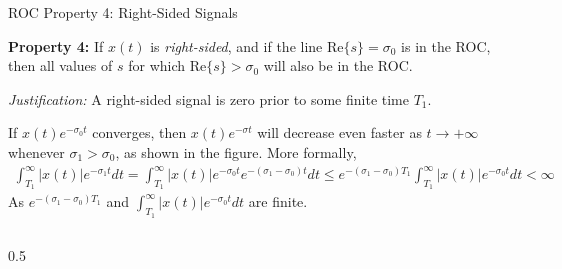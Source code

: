 \begin{frame}[fragile]{ROC Property 4: Right-Sided Signals}
    \begin{tcolorbox}[colframe=PrimaryColor, colback=PrimaryColor!10]
        \textbf{Property 4:} If $x(t)$ is \textit{right-sided}, and if the line $\text{Re}\{s\} = \sigma_0$ is in the ROC, then all values of $s$ for which $\text{Re}\{s\} > \sigma_0$ will also be in the ROC.
    \end{tcolorbox}
    \vspace{0.2cm}
    \textit{Justification:} A right-sided signal is zero prior to some finite time $T_1$.

    If $x(t)e^{-\sigma_0 t}$ converges, then $x(t)e^{-\sigma t}$ will decrease even faster as $t \to +\infty$ whenever $\sigma_1 > \sigma_0$, as shown in the figure. More formally,
    \begin{align*}
        \int_{T_1}^\infty |x(t)|e^{-\sigma_1 t} dt = \int_{T_1}^\infty |x(t)|e^{-\sigma_0 t} e^{-(\sigma_1 - \sigma_0)t} dt
        \le e^{-(\sigma_1 - \sigma_0)T_1} \int_{T_1}^\infty |x(t)|e^{-\sigma_0 t} dt < \infty
    \end{align*}
    As $e^{-(\sigma_1 - \sigma_0)T_1} $ and $\int_{T_1}^\infty |x(t)|e^{-\sigma_0 t} dt$ are finite.
    \begin{columns}
        \begin{column}{0.5\textwidth}
            \begin{center}
\end{center}
\end{column}
\end{columns}
\end{frame}
